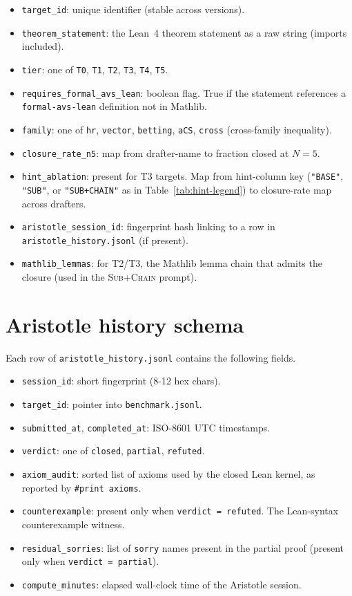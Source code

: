 \begin{itemize}[leftmargin=1.3em, itemsep=0.15em]
\item \texttt{target\_id}: unique identifier (stable across versions).
\item \texttt{theorem\_statement}: the Lean~4 theorem statement as a
raw string (imports included).
\item \texttt{tier}: one of \texttt{T0}, \texttt{T1}, \texttt{T2},
\texttt{T3}, \texttt{T4}, \texttt{T5}.
\item \texttt{requires\_formal\_avs\_lean}: boolean flag. True if
the statement references a \texttt{formal-avs-lean} definition
not in Mathlib.
\item \texttt{family}: one of \texttt{hr}, \texttt{vector},
\texttt{betting}, \texttt{aCS}, \texttt{cross} (cross-family
inequality).
\item \texttt{closure\_rate\_n5}: map from drafter-name to fraction
closed at $N=5$.
\item \texttt{hint\_ablation}: present for T3 targets. Map from
hint-column key (\texttt{"BASE"}, \texttt{"SUB"}, or
\texttt{"SUB+CHAIN"} as in Table~\ref{tab:hint-legend}) to
closure-rate map across drafters.
\item \texttt{aristotle\_session\_id}: fingerprint hash linking to a
row in \texttt{aristotle\_history.jsonl} (if present).
\item \texttt{mathlib\_lemmas}: for T2/T3, the Mathlib lemma chain
that admits the closure (used in the \textsc{Sub+Chain} prompt).
\end{itemize}

\section{Aristotle history schema}
\label{app:aristotle}

Each row of \texttt{aristotle\_history.jsonl} contains the following
fields.

\begin{itemize}[leftmargin=1.3em, itemsep=0.15em]
\item \texttt{session\_id}: short fingerprint (8-12 hex chars).
\item \texttt{target\_id}: pointer into \texttt{benchmark.jsonl}.
\item \texttt{submitted\_at}, \texttt{completed\_at}: ISO-8601 UTC
timestamps.
\item \texttt{verdict}: one of \texttt{closed}, \texttt{partial},
\texttt{refuted}.
\item \texttt{axiom\_audit}: sorted list of axioms used by the closed
Lean kernel, as reported by \texttt{\#print axioms}.
\item \texttt{counterexample}: present only when \texttt{verdict =
refuted}. The Lean-syntax counterexample witness.
\item \texttt{residual\_sorries}: list of \texttt{sorry} names present
in the partial proof (present only when \texttt{verdict = partial}).
\item \texttt{compute\_minutes}: elapsed wall-clock time of the Aristotle session.
\end{itemize}

